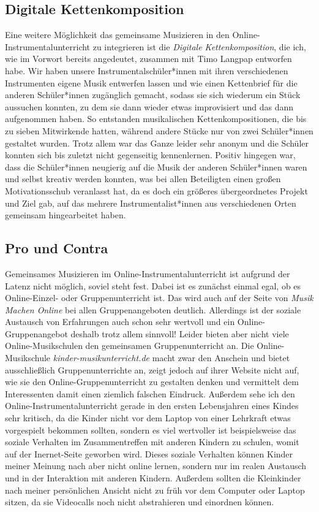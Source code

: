 \subsection{Digitale Kettenkomposition}

Eine weitere Möglichkeit das gemeinsame Musizieren in den
Online-Instrumentalunterricht zu integrieren ist die \emph{Digitale
Kettenkomposition}, die ich, wie im Vorwort bereits angedeutet, zusammen mit
Timo Langpap entworfen habe. Wir haben unsere Instrumentalschüler*innen mit
ihren verschiedenen Instrumenten eigene Musik entwerfen lassen und wie einen
Kettenbrief für die anderen Schüler*innen zugänglich gemacht, sodass sie sich
wiederum ein Stück aussuchen konnten, zu dem sie dann wieder etwas improvisiert
und das dann aufgenommen haben. So entstanden musikalischen Kettenkompositionen,
die bis zu sieben Mitwirkende hatten, während andere Stücke nur von zwei
Schüler*innen gestaltet wurden. Trotz allem war das Ganze leider sehr anonym und
die Schüler konnten sich bis zuletzt nicht gegenseitig kennenlernen. Positiv
hingegen war, dass die Schüler*innen neugierig auf die Musik der anderen
Schüler*innen waren und selbst kreativ werden konnten, was bei allen Beteiligten
einen großen Motivationsschub veranlasst hat, da es doch ein größeres
übergeordnetes Projekt und Ziel gab, auf das mehrere Instrumentalist*innen aus
verschiedenen Orten gemeinsam hingearbeitet haben. 


\subsection{Pro und Contra}

Gemeinsames Musizieren im Online-Instrumentalunterricht ist aufgrund der Latenz
nicht möglich, soviel steht fest. Dabei ist es zunächst einmal egal, ob es
Online-Einzel- oder Gruppenunterricht ist. Das wird auch auf der Seite von
\emph{Musik Machen Online} bei allen Gruppenangeboten deutlich. Allerdings ist
der soziale Austausch von Erfahrungen auch schon sehr wertvoll und ein
Online-Gruppenangebot deshalb trotz allem sinnvoll! Leider bieten aber nicht
viele Online-Musikschulen den gemeinsamen Gruppenunterricht an. Die
Online-Musikschule \emph{kinder-musikunterricht.de} macht zwar den Anschein und
bietet ausschließlich Gruppenunterrichte an, zeigt jedoch auf ihrer Website
nicht auf, wie sie den Online-Gruppenunterricht zu gestalten denken und
vermittelt dem Interessenten damit einen ziemlich falschen Eindruck. Außerdem
sehe ich den Online-Instrumentalunterricht gerade in den ersten Lebensjahren
eines Kindes sehr kritisch, da die Kinder nicht vor dem Laptop von einer
Lehrkraft etwas vorgespielt bekommen sollten, sondern es viel wertvoller ist
beispielsweise das soziale Verhalten im Zusammentreffen mit anderen Kindern zu
schulen, womit auf der Inernet-Seite geworben wird. Dieses soziale Verhalten
können Kinder meiner Meinung nach aber nicht online lernen, sondern nur im
realen Austausch und in der Interaktion mit anderen Kindern. Außerdem sollten
die Kleinkinder nach meiner persönlichen Ansicht nicht zu früh vor dem Computer
oder Laptop sitzen, da sie Videocalls noch nicht abstrahieren und einordnen
können. 

